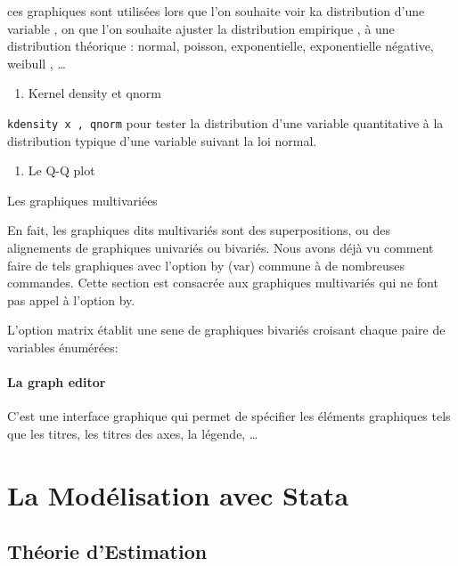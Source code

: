 \documentclass[
]{book}
\providecommand{\tightlist}{%
  \setlength{\itemsep}{0pt}\setlength{\parskip}{0pt}}
\begin{document}
ces graphiques sont utilisées lors que l'on souhaite voir ka distribution d'une variable , on que l'on souhaite ajuster la distribution empirique , à une distribution théorique : normal, poisson, exponentielle, exponentielle négative, weibull , \ldots{}

\begin{enumerate}
\def\labelenumi{(\arabic{enumi})}
\tightlist
\item
  Kernel density et qnorm
\end{enumerate}

\texttt{kdensity\ x\ ,\ qnorm} pour tester la distribution d'une variable quantitative à la distribution typique d'une variable suivant la loi normal.

\begin{enumerate}
\def\labelenumi{(\arabic{enumi})}
\setcounter{enumi}{1}
\tightlist
\item
  Le Q-Q plot
\end{enumerate}

Les graphiques multivariées

En fait, les graphiques dits multivariés sont des superpositions,
ou des alignements de graphiques univariés ou bivariés. Nous
avons déjà vu comment faire de tels graphiques avec l'option
by (var) commune à de nombreuses commandes. Cette section
est consacrée aux graphiques multivariés qui ne font pas appel à
l'option by.

L'option matrix établit une sene de graphiques bivariés
croisant chaque paire de variables énumérées:

\hypertarget{la-graph-editor}{%
\subsubsection{La graph editor}\label{la-graph-editor}}

C'est une interface graphique qui permet de spécifier les éléments graphiques tels que les titres, les titres des axes, la légende, \ldots{}

\hypertarget{la-moduxe9lisation-avec-stata}{%
\chapter{La Modélisation avec Stata}\label{la-moduxe9lisation-avec-stata}}

\hypertarget{thuxe9orie-destimation}{%
\section{Théorie d'Estimation}\label{thuxe9orie-destimation}}
\end{document}
